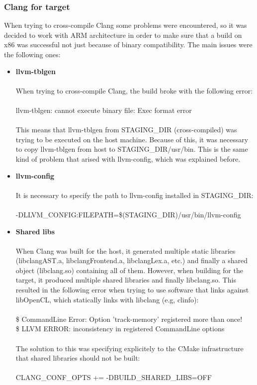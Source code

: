 \documentclass[12pt,a4paper,oneside]{article}
\begin{document}
\newpage
\subsubsection*{Clang for target}
When trying to cross-compile Clang some problems were encountered, so it was
decided to work with ARM architecture in order to make sure that a build on x86
was successful not just because of binary compatibility. The main issues were the
following ones:
\begin{itemize}
  \item \textbf{llvm-tblgen}\\\\
  When trying to cross-compile Clang, the build broke with the following error:\\\\
  {\selectfont llvm-tblgen: cannot execute binary file: Exec
  format error}\\\\
  This means that llvm-tblgen from STAGING\_DIR (cross-compiled) was trying to be
  executed on the host machine. Because of this, it was necessary to copy
  llvm-tblgen from host to STAGING\_DIR/usr/bin. This is the same kind of problem
  that arised with llvm-config, which was explained before.

  \item \textbf{llvm-config}\\\\
  It is necessary to specify the path to llvm-config installed in STAGING\_DIR:\\\\
  {\selectfont -DLLVM\_CONFIG:FILEPATH=\$(STAGING\_DIR)/usr/bin/llvm-config}

  \item \textbf{Shared libs}\\\\
  When Clang was built for the host, it generated multiple static libraries
  (libclangAST.a, libclangFrontend.a, libclangLex.a, etc.) and finally a shared
  object (libclang.so) containing all of them. However, when building for the
  target, it produced multiple shared libraries and finally libclang.so. This
  resulted in the following error when trying to use software that links against
  libOpenCL, which statically links with libclang (e.g, clinfo):\\\\
  {\selectfont
  \$ CommandLine Error: Option 'track-memory' registered more than once!\\
  \$ LLVM ERROR: inconsistency in registered CommandLine options
  }\\\\
  The solution to this was specifying explicitely to the CMake infrastructure that
  shared libraries should not be built:\\\\
  {\selectfont CLANG\_CONF\_OPTS += -DBUILD\_SHARED\_LIBS=OFF}
\end{itemize}
\end{document}
